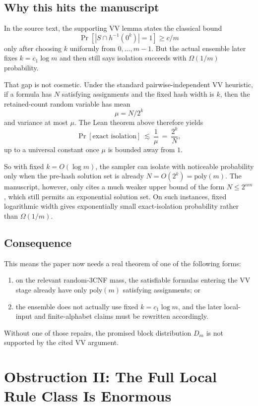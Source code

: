 \documentclass[11pt]{article}
\theoremstyle{remark}
\begin{document}
\subsection{Why this hits the manuscript}

In the source text, the supporting VV lemma states the classical bound
\[
  \Pr[|S\cap h^{-1}(0^k)|=1]\ge c/m
\]
only after choosing \(k\) uniformly from \(0,\dots,m-1\).  But the actual ensemble later fixes
\(k=c_1\log m\) and then still says isolation succeeds with \(\Omega(1/m)\) probability.

That gap is not cosmetic.  Under the standard pairwise-independent VV heuristic, if a formula has
\(N\) satisfying assignments and the fixed hash width is \(k\), then the retained-count random
variable has mean
\[
  \mu = N/2^k
\]
and variance at most \(\mu\).  The Lean theorem above therefore yields
\[
  \Pr[\text{exact isolation}]
  \ \lesssim\
  \frac{1}{\mu}
  \ =\
  \frac{2^k}{N},
\]
up to a universal constant once \(\mu\) is bounded away from \(1\).

So with fixed \(k=O(\log m)\), the sampler can isolate with noticeable probability only when the
pre-hash solution set is already \(N=O(2^k)=\mathrm{poly}(m)\).  The manuscript, however, only
cites a much weaker upper bound of the form \(N\le 2^{\alpha m}\), which still permits an
exponential solution set.  On such instances, fixed logarithmic width gives exponentially small
exact-isolation probability rather than \(\Omega(1/m)\).

\subsection{Consequence}

This means the paper now needs a real theorem of one of the following forms:
\begin{enumerate}[leftmargin=1.5em]
  \item on the relevant random-3CNF mass, the satisfiable formulas entering the VV stage already
  have only \(\mathrm{poly}(m)\) satisfying assignments; or
  \item the ensemble does not actually use fixed \(k=c_1\log m\), and the later local-input and
  finite-alphabet claims must be rewritten accordingly.
\end{enumerate}

Without one of those repairs, the promised block distribution \(D_m\) is not supported by the
cited VV argument.

\section{Obstruction II: The Full Local Rule Class Is Enormous}
\end{document}
